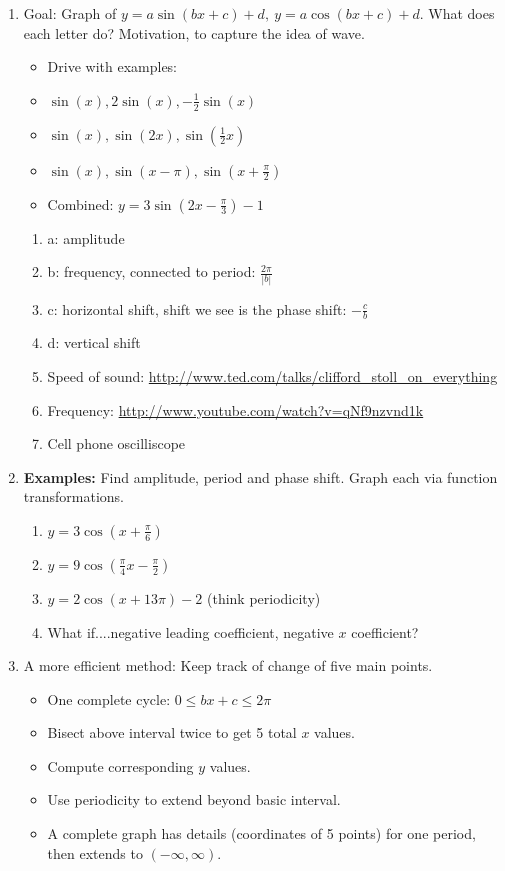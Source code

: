 \documentclass{article}
\begin{document}
\begin{enumerate}
\item Goal: Graph of $y = a\sin (bx+c)+d, ~y = a\cos (bx+c)+d$. What does each letter do? Motivation, to capture the idea of wave.
\begin{itemize}
\item Drive with examples: 
\item $\sin(x), 2\sin(x), -\frac{1}{2}\sin(x)$
\item $\sin(x), \sin(2x), \sin(\frac{1}{2}x)$
\item $\sin(x), \sin(x-\pi), \sin(x+\frac{\pi}{2})$
\item Combined: $y=3\sin(2x-\frac{\pi}{3}) - 1$
\end{itemize}
\begin{enumerate}
\item a: amplitude
\item b: frequency, connected to period: $\frac{2\pi}{|b|}$
\item c: horizontal shift, shift we see is the phase shift: $-\frac{c}{b}$
\item d: vertical shift
\item Speed of sound: \url{http://www.ted.com/talks/clifford_stoll_on_everything}
\item Frequency: \url{http://www.youtube.com/watch?v=qNf9nzvnd1k}
\item Cell phone oscilliscope
\end{enumerate}

\item {\bf Examples:} Find amplitude, period and phase shift. Graph each via function transformations.
\begin{enumerate}
\item $y=3\cos(x+\frac{\pi}{6})$
\item $y=9\cos(\frac{\pi}{4}x-\frac{\pi}{2})$
\item $y=2\cos(x+13\pi)-2$ (think periodicity)
\item What if....negative leading coefficient, negative $x$ coefficient?
\end{enumerate}

\item A more efficient method: Keep track of change of five main points.
\begin{itemize}
\item One complete cycle: $0 \leq bx+c \leq 2\pi$
\item Bisect above interval twice to get 5 total $x$ values.
\item Compute corresponding $y$ values.
\item Use periodicity to extend beyond basic interval.
\item A complete graph has details (coordinates of 5 points) for one period, then extends to $(-\infty,\infty)$.
\end{itemize}


\end{enumerate}
\end{document}
